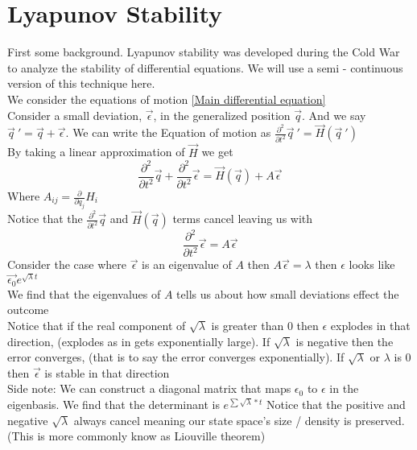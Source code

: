 \section{Lyapunov Stability}
First some background. Lyapunov stability was developed during the Cold War to analyze the stability of differential equations. We will use a semi - continuous version of this technique here.\\

We consider the equations of motion \ref{Main differential equation}\\
Consider a small deviation, $\vec{\epsilon}$, in the generalized position $\vec{q}$. And we say $\vec{q}\ ' = \vec{q} + \vec{\epsilon}$. We can write the Equation of motion as $\frac{\partial^2}{\partial t^2}\vec{q}\ ' = \vec{H}(\vec{q}\ ')$\\
By taking a linear approximation of $\vec{H}$ we get
\[\frac{\partial^2}{\partial t^2}\vec{q} +  \frac{\partial^2}{\partial t^2}\vec{\epsilon}= \vec{H}(\vec{q}) + A\vec{\epsilon}\]
Where $A_{ij} = \frac{\partial}{\partial q_j}H_i$\\
Notice that the $\frac{\partial^2}{\partial t^2}\vec{q}$ and $\vec{H}(\vec{q})$ terms cancel leaving us with
\[\frac{\partial^2}{\partial t^2}\vec{\epsilon} =  A\vec{\epsilon}\]
Consider the case where $\vec{\epsilon}$ is an eigenvalue of $A$ then $A\vec{\epsilon} = \lambda$ then $\epsilon$ looks like $\vec{\epsilon_0}e^{\sqrt{\lambda} t}$\\
We find that the eigenvalues of $A$ tells us about how small deviations effect the outcome\\
Notice that if the real component of $\sqrt{\lambda}$ is greater than $0$ then $\epsilon$ explodes in that direction, (explodes as in gets exponentially large).
If $\sqrt{\lambda}$ is negative then the error converges, (that is to say the error converges exponentially). If $\sqrt{\lambda}$ or $\lambda$ is 0 then $\vec{\epsilon}$ is stable in that direction\\
Side note: We can construct a diagonal matrix that maps $\epsilon_0$ to $\epsilon$ in the eigenbasis. We find that the determinant is $e^{\sum\sqrt{\lambda} * t}$ Notice that the positive and negative $\sqrt{\lambda}$ always cancel meaning our state space's size / density is preserved. (This is more commonly know as Liouville theorem)\\

